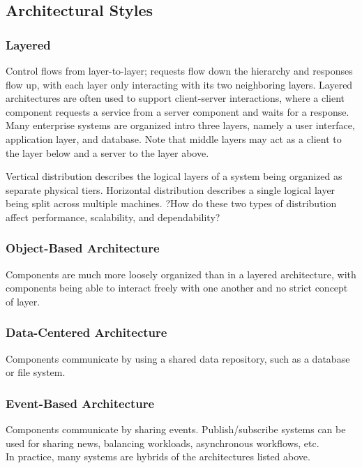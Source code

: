 \documentclass[12pt,titlepage]{article}
\begin{document}
    \subsection{Architectural Styles}
      \subsubsection{Layered}
        Control flows from layer-to-layer; requests flow down the hierarchy and responses flow up, with each layer only interacting with its two neighboring layers.
        Layered architectures are often used to support client-server interactions, where a client component requests a service from a server component and waits for
        a response. Many enterprise systems are organized intro three layers, namely a user interface, application layer, and database. Note that middle layers may
        act as a client to the layer below and a server to the layer above.

        Vertical distribution describes the logical layers of a system being organized as separate physical tiers. Horizontal distribution describes a single logical
        layer being split across multiple machines. ?How do these two types of distribution affect performance, scalability, and dependability?

      \subsubsection{Object-Based Architecture}
        Components are much more loosely organized than in a layered architecture, with components being able to interact freely with one another and no strict concept
        of layer.

      \subsubsection{Data-Centered Architecture}
        Components communicate by using a shared data repository, such as a database or file system.

      \subsubsection{Event-Based Architecture}
        Components communicate by sharing events. Publish/subscribe systems can be used for sharing news, balancing workloads, asynchronous workflows, etc.\\

      In practice, many systems are hybrids of the architectures listed above.
      
\end{document}
